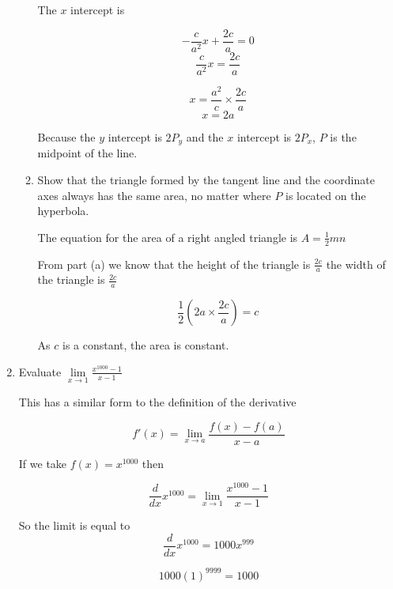 \documentclass{article}
\begin{document}
\begin{enumerate}
\begin{enumerate}
					The $x$ intercept is 

					$$- \frac{c}{a^2}x + \frac{2c}{a} = 0$$
					$$\frac{c}{a^2}x = \frac{2c}{a}$$

					$$x = \frac{a^2}{c} \times \frac{2c}{a}$$
					$$x = 2a$$

					Because the $y$ intercept is $2P_{y}$ and the $x$ intercept
					is $2P_{x}$, $P$ is the midpoint of the line.

				\item Show that the triangle formed by the tangent line and the coordinate
					axes always has the same area, no matter where $P$ is located on the
					hyperbola.

					The equation for the area of a right angled triangle is $A = \frac{1}{2}mn$

					From part (a) we know that the height of the triangle is $\frac{2c}{a}$ the
					width of the triangle is $\frac{2c}{a}$

					$$\frac{1}{2}(2a \times \frac{2c}{a}) = c$$

					As $c$ is a constant, the area is constant.
			\end{enumerate}

			\item Evaluate $\lim \limits _{x \to 1} \frac{x^{1000} - 1}{x - 1}$

				This has a similar form to the definition of the derivative

				$$f'(x) = \lim \limits _{x \to a} \frac{f(x) - f(a)}{x-a}$$
				
				If we take $f(x) = x^{1000}$ then

				$$\frac{d}{dx} x^{1000} = \lim \limits _{x \to 1} \frac{x^{1000} - 1}{x-1}$$

				So the limit is equal to $$\frac{d}{dx} x^{1000} = 1000x^{999}$$

				$$1000(1)^{9999} = 1000$$
	\end{enumerate}	
\end{document}
